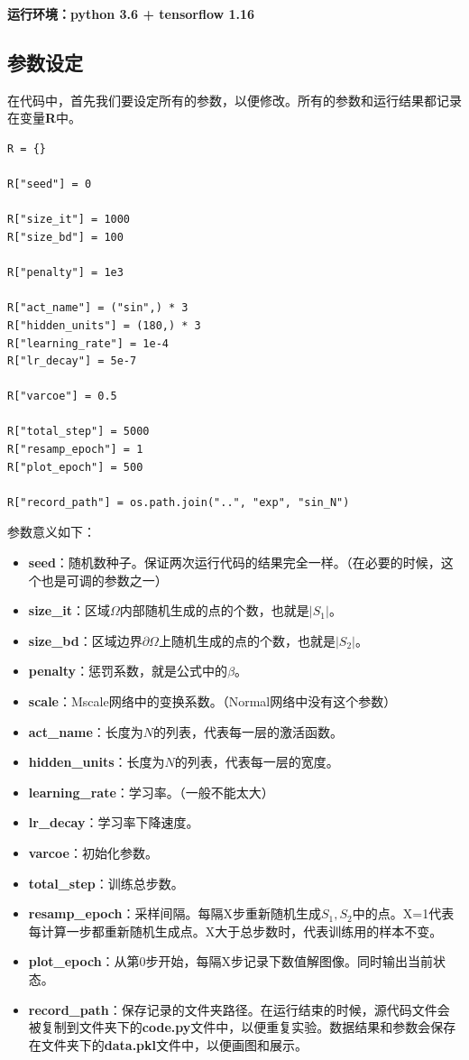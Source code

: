 \documentclass[12pt,a4paper]{article}
\begin{document}
\textbf{运行环境：python 3.6 + tensorflow 1.16}

\subsection*{参数设定}

在代码中，首先我们要设定所有的参数，以便修改。所有的参数和运行结果都记录在变量\textbf{R}中。

\begin{lstlisting}
R = {}

R["seed"] = 0

R["size_it"] = 1000
R["size_bd"] = 100

R["penalty"] = 1e3

R["act_name"] = ("sin",) * 3
R["hidden_units"] = (180,) * 3
R["learning_rate"] = 1e-4
R["lr_decay"] = 5e-7

R["varcoe"] = 0.5

R["total_step"] = 5000
R["resamp_epoch"] = 1
R["plot_epoch"] = 500

R["record_path"] = os.path.join("..", "exp", "sin_N")
\end{lstlisting}

参数意义如下：

\begin{itemize}
\item \textbf{seed}：随机数种子。保证两次运行代码的结果完全一样。（在必要的时候，这个也是可调的参数之一）
\item \textbf{size\_it}：区域$\Omega$内部随机生成的点的个数，也就是$|S_1|$。
\item \textbf{size\_bd}：区域边界$\partial \Omega$上随机生成的点的个数，也就是$|S_2|$。
\item \textbf{penalty}：惩罚系数，就是公式中的$\beta$。
\item \textbf{scale}：Mscale网络中的变换系数。（Normal网络中没有这个参数）
\item \textbf{act\_name}：长度为$N$的列表，代表每一层的激活函数。
\item \textbf{hidden\_units}：长度为$N$的列表，代表每一层的宽度。
\item \textbf{learning\_rate}：学习率。（一般不能太大）
\item \textbf{lr\_decay}：学习率下降速度。
\item \textbf{varcoe}：初始化参数。
\item \textbf{total\_step}：训练总步数。
\item \textbf{resamp\_epoch}：采样间隔。每隔X步重新随机生成$S_1,S_2$中的点。X=1代表每计算一步都重新随机生成点。X大于总步数时，代表训练用的样本不变。
\item \textbf{plot\_epoch}：从第0步开始，每隔X步记录下数值解图像。同时输出当前状态。
\item \textbf{record\_path}：保存记录的文件夹路径。在运行结束的时候，源代码文件会被复制到文件夹下的\textbf{code.py}文件中，以便重复实验。数据结果和参数会保存在文件夹下的\textbf{data.pkl}文件中，以便画图和展示。
\end{itemize}
\end{document}

